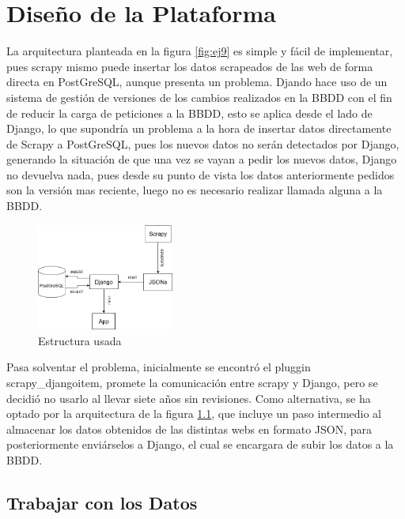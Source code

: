 \chapter[Diseño de la Plataforma]{Diseño de la Plataforma}
\label{Chap4}

La arquitectura planteada en la figura \ref{fig:ej9} es simple y fácil de implementar, pues scrapy mismo puede insertar los datos scrapeados de las web de forma directa en PostGreSQL, aunque presenta un problema. Djando hace uso de un sistema de gestión de versiones de los cambios realizados en la BBDD con el fin de reducir la carga de peticiones a la BBDD, esto se aplica desde el lado de Django, lo que supondría un problema a la hora de insertar datos directamente de Scrapy a PostGreSQL, pues los nuevos datos no serán detectados por Django, generando la situación de que una vez se vayan a pedir los nuevos datos, Django no devuelva nada, pues desde su punto de vista los datos anteriormente pedidos son la versión mas reciente, luego no es necesario realizar llamada alguna a la BBDD.

\begin{figure} [H]
	\centering
	\includegraphics[width=0.4\textwidth]{fig/estructura_usada.png}
	\caption[Estructura de datos usada en el proyecto]{Estructura usada}
	\label{fig:ej10}
\end{figure}

Pasa solventar el problema, inicialmente se encontró el pluggin scrapy\_djangoitem, promete la comunicación entre scrapy y Django, pero se decidió no usarlo al llevar siete años sin revisiones. Como alternativa, se ha optado por la arquitectura de la figura \ref{fig:ej10}, que incluye un paso intermedio al almacenar los datos obtenidos de las distintas webs en formato JSON, para posteriormente enviárselos a Django, el cual se encargara de subir los datos a la BBDD.

\section{Trabajar con los Datos}

